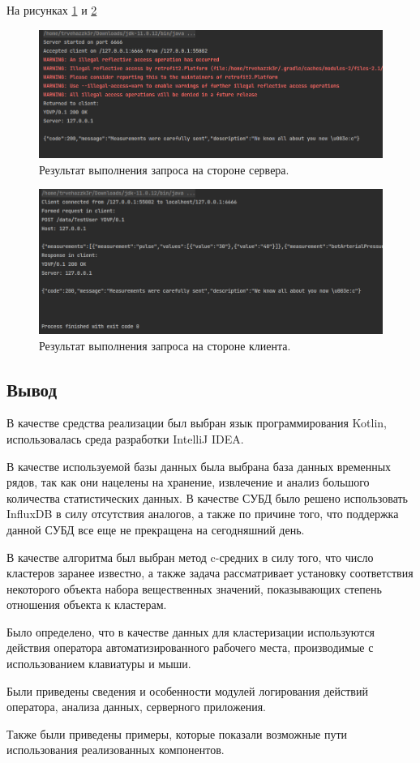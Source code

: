 На рисунках \ref{fig:serverExample} и \ref{fig:clientExample}

\begin{figure}[H]
	\centering
	\includegraphics[width=\textwidth]{img/serverOutput.png}
	\caption{Результат выполнения запроса на стороне сервера.}
	\label{fig:serverExample}
\end{figure}

\begin{figure}[H]
	\centering
	\includegraphics[width=\textwidth]{img/clientOutput.png}
	\caption{Результат выполнения запроса на стороне клиента.}
	\label{fig:clientExample}
\end{figure}

\subsection*{Вывод}
В качестве средства реализации был выбран язык программирования \newline Kotlin, использовалась среда разработки IntelliJ IDEA.

В качестве используемой базы данных была выбрана база данных временных рядов, так как они нацелены на хранение, извлечение и анализ большого количества статистических данных. В качестве СУБД было решено использовать InfluxDB в силу отсутствия аналогов, а также по причине того, что поддержка данной СУБД все еще не прекращена на сегодняшний день.

В качестве алгоритма был выбран метод c-средних в силу того, что число кластеров заранее известно, а также задача рассматривает установку соответствия некоторого объекта набора вещественных значений, показывающих степень отношения объекта к кластерам.

Было определено, что в качестве данных для кластеризации используются действия оператора автоматизированного рабочего места, производимые с использованием клавиатуры и мыши.

Были приведены сведения и особенности модулей логирования действий оператора, анализа данных, серверного приложения.

Также были приведены примеры, которые показали возможные пути использования реализованных компонентов.

